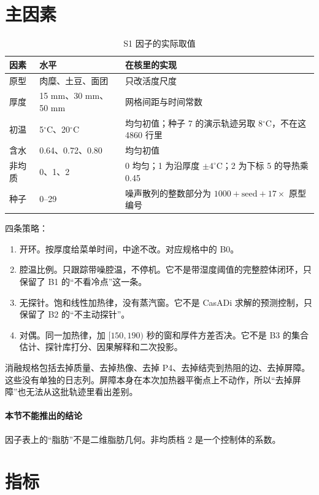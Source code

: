 \section{主因素}

\begin{table}[ht]
\centering
\caption{S1 因子的实际取值}
\begin{tabularx}{\textwidth}{llX}
\toprule
因素 & 水平 & 在核里的实现 \\
\midrule
原型 & 肉糜、土豆、面团 & 只改活度尺度 \\
厚度 & 15 mm、30 mm、50 mm & 网格间距与时间常数 \\
初温 & 5\(^\circ\mathrm{C}\)、20\(^\circ\mathrm{C}\) & 均匀初值；种子 7 的演示轨迹另取 8\(^\circ\mathrm{C}\)，不在这 4860 行里 \\
含水 & 0.64、0.72、0.80 & 均匀初值 \\
非均质 & 0、1、2 & 0 均匀；1 为沿厚度 \(\pm 4^\circ\mathrm{C}\)；2 为下标 5 的导热乘 0.45 \\
种子 & 0--29 & 噪声散列的整数部分为 \(1000+\mathrm{seed}+17\times\) 原型编号 \\
\bottomrule
\end{tabularx}
\end{table}

四条策略：

\begin{enumerate}
\item 开环。按厚度给菜单时间，中途不改。对应规格中的 B0。
\item 腔温比例。只跟踪带噪腔温，不停机。它不是带湿度阈值的完整腔体闭环，只保留了 B1 的“不看冷点”这一条。
\item 无探针。饱和线性加热律，没有蒸汽窗。它不是 CasADi 求解的预测控制，只保留了 B2 的“不主动探针”。
\item 对偶。同一加热律，加 \([150,190)\) 秒的窗和厚件方差否决。它不是 B3 的集合估计、探针库打分、因果解释和二次投影。
\end{enumerate}

消融规格包括去掉质量、去掉热像、去掉 P4、去掉结壳到热阻的边、去掉屏障。这些没有单独的日志列。屏障本身在本次加热器平衡点上不动作，所以“去掉屏障”也无法从这批轨迹里看出差别。

\paragraph{本节不能推出的结论}
因子表上的“脂肪”不是二维脂肪几何。非均质档 2 是一个控制体的系数。

\section{指标}

